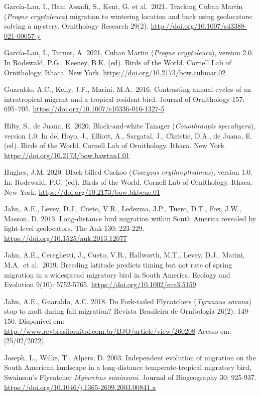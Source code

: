 \documentclass[
  oneside]{scrbook}
\begin{document}
García-Lau, I., Bani Assadi, S., Kent, G. et al.~2021. Tracking Cuban Martin (\emph{Progne cryptoleuca}) migration to wintering location and back using geolocators: solving a mystery. Ornithology Research 29(2). \url{http://doi.org/10.1007/s43388-021-00057-y}

García-Lau, I., Turner, A. 2021. Cuban Martin (\emph{Progne cryptoleuca}), version 2.0. In Rodewald, P.G., Keeney, B.K. (ed). Birds of the World. Cornell Lab of Ornithology. Ithaca. New York. \url{https://doi.org/10.2173/bow.cubmar.02}

Guaraldo, A.C., Kelly, J.F., Marini, M.A.~2016. Contrasting annual cycles of an intratropical migrant and a tropical resident bird. Journal of Ornithology 157: 695--705. \url{https://doi.org/10.1007/s10336-016-1327-5}

Hilty, S., de Juana, E. 2020. Black-and-white Tanager (\emph{Conothraupis speculigera}), version 1.0. In del Hoyo, J., Elliott, A., Sargatal, J., Christie, D.A., de Juana, E. (ed). Birds of the World. Cornell Lab of Ornithology. Ithaca. New York. \url{https://doi.org/10.2173/bow.bawtan1.01}

Hughes, J.M. 2020. Black-billed Cuckoo (\emph{Coccyzus erythropthalmus}), version 1.0. In: Rodewald, P.G. (ed). Birds of the World. Cornell Lab of Ornithology. Ithaca. New York. \url{https://doi.org/10.2173/bow.bkbcuc.01}

Jahn, A.E., Levey, D.J., Cueto, V.R., Ledezma, J.P., Tuero, D.T., Fox, J.W., Masson, D. 2013. Long-distance bird migration within South America revealed by light-level geolocators. The Auk 130: 223-229. \url{https://doi.org/10.1525/auk.2013.12077}

Jahn, A.E., Cereghetti, J., Cueto, V.R., Hallworth, M.T., Levey, D.J., Marini, M.A.~et al.~2019. Breeding latitude predicts timing but not rate of spring migration in a widespread migratory bird in South America. Ecology and Evolution 9(10): 5752-5765. \url{https://doi.org/10.1002/ece3.5159}

Jahn, A.E., Guaraldo, A.C. 2018. Do Fork-tailed Flycatchers (\emph{Tyrannus savana}) stop to molt during fall migration? Revista Brasileira de Ornitologia 26(2): 149-150. Disponível em: \url{http://www.revbrasilornitol.com.br/BJO/article/view/260208} Acesso em: {[}25/02/2022{]}.

Joseph, L., Wilke, T., Alpers, D. 2003. Independent evolution of migration on the South American landscape in a long-distance temperate-tropical migratory bird, Swainson's Flycatcher \emph{Myiarchus swainsoni}. Journal of Biogeography 30: 925-937. \url{https://doi.org/10.1046/j.1365-2699.2003.00841.x}
\end{document}
